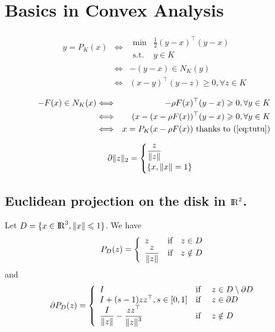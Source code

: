 \clearpage
\appendix

\section{Basics in Convex Analysis}
\label{Sec:Ann:ConvexAnalysis}
\begin{eqnarray}
y = P_K(x) & \Longleftrightarrow &
\begin{array}{ll}
  \min &\frac 1 2 (y-x)^\top (y-x ) \\
  \text {s.t. } & y \in K
\end{array}
\\
& \Longleftrightarrow & - (y-x) \in N_K(y) \\
& \Longleftrightarrow & (x-y)^\top(y-z) \geq 0, \forall z \in K 
\label{eq:tutu}
\end{eqnarray}

\begin{eqnarray}
-F(x) \in N_K(x) & \Longleftrightarrow & -\rho F(x)^\top(y-x) \geq 0, \forall y \in K\\
& \Longleftrightarrow &  (x-(x - \rho F(x))^\top(y-x) \geq 0, \forall y \in K \\
& \Longleftrightarrow &  x = P_K(x- \rho F(x)) \text{ thanks to (\ref{eq:tutu})} 
\end{eqnarray}

\begin{equation}
  \label{eq:sub-norm}
  \partial \|z\|_2 =
  \begin{cases}
      \Frac z {\|z\|}\\
      \{x, \|x\|=1 \}
    \end{cases}
\end{equation}
\subsection{Euclidean projection on the disk  in $\RR^2$.}
Let $D=\{x \in \RR^3, \|x\| \leq 1\}$. We have 
\begin{equation}
  \label{eq:projD}
  P_{D}(z) =\left\{
  \begin{array}{lcl}
    z &\text{if}& z \in D \\
    \Frac {z} {\|z\|}& \text{if}&z \notin D
    \end{array}\right. 
  \end{equation}
 and
\begin{equation}
  \label{eq:sub-projD}
  \partial P_{D}(z) =\left\{
  \begin{array}{lcl}
   I &\text{if }& z \in D \setminus \partial D \\
   I + (s-1)z z^\top , s\in [0,1]   &\text{if }& z \in  \partial D \\
   \Frac I {\|z\|} - \Frac{z z^\top}{\|z\|^3} &\text{if }& z \notin D  
   \end{array}\right. 
\end{equation}

